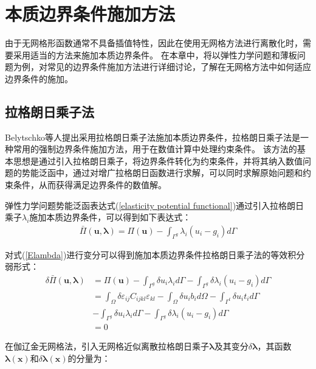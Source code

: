 \chapter{本质边界条件施加方法}
由于无网格形函数通常不具备插值特性，因此在使用无网格方法进行离散化时，需要采用适当的方法来施加本质边界条件。
在本章中，将以弹性力学问题和薄板问题为例，对常见的边界条件施加方法进行详细讨论，了解在无网格方法中如何适应边界条件的施加。

\section{拉格朗日乘子法}
Belytschko等人\cite{}提出采用拉格朗日乘子法施加本质边界条件，拉格朗日乘子法是一种常用的强制边界条件施加方法，用于在数值计算中处理约束条件。
该方法的基本思想是通过引入拉格朗日乘子，将边界条件转化为约束条件，并将其纳入数值问题的势能泛函中，通过对增广拉格朗日函数进行求解，可以同时求解原始问题和约束条件，从而获得满足边界条件的数值解。\par
弹性力学问题势能泛函表达式(\ref{elasticity potential functional})通过引入拉格朗日乘子$\lambda_i$施加本质边界条件，可以得到如下表达式：
\begin{equation}\label{Elambda}
\begin{split}
    \bar{\Pi}(\pmb{u},\pmb \lambda)=\Pi(\pmb{u})-\int_{\Gamma^g}\lambda_i(u_i-g_i)d\Gamma
\end{split}
\end{equation}   
\par
对式(\ref{Elambda})进行变分可以得到施加本质边界条件拉格朗日乘子法的等效积分弱形式：
\begin{equation}\label{Elambda weakform}
\begin{split}
        \delta\bar{\Pi}(\pmb{u},\pmb{\lambda})&=\Pi(\pmb{u})-\int_{\Gamma^g}\delta u_i\lambda_id\Gamma-\int_{\Gamma^g}\delta\lambda_i(u_i-g_i)d\Gamma\\
       &=\int_{\Omega}\delta\varepsilon_{ij}C_{ijkl}\varepsilon_{kl}-\int_{\Omega}\delta u_ib_id\Omega-\int_{\Gamma^t}\delta u_it_id\Gamma\\
       &-\int_{\Gamma^g}\delta u_i\lambda_id\Gamma-\int_{\Gamma^g}\delta\lambda_i(u_i-g_i)d\Gamma\\
       &=0
\end{split}
\end{equation}\par
在伽辽金无网格法，引入无网格近似离散拉格朗日乘子$\pmb{\lambda}$及其变分$\delta\pmb{\lambda}$，其函数$\pmb \lambda(\pmb{x})$和$\delta\pmb \lambda(\pmb{x})$的分量为：
